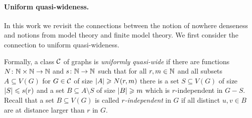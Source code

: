 \begin{comment}
These alternative characterizations have been very useful in 
the design of efficient algorithms. For instance, 
the {\sc{Subgraph Isomorphism}} and {\sc{Homomorphism}} problems 
are fixed-parameter tractable on any nowhere dense
class, parameterized by the size of the pattern graph~\cite{nevsetvril2010first}
and so is the {\sc Distance-$r$ Dominating Set} problem, parameterized
by the size of the solution~\cite{DawarK09}. In fact, 
the {\sc Distance-$r$ Dominating Set} problem admits
polynomial kernels~\cite{siebertz2016polynomial} and even 
almost linear kernels on nowhere dense classes of 
graphs~\cite{eickmeyer2016neighborhood}
(see also~\cite{drange2016kernelization} for the case $r=1$). 
It was shown in~\cite{grohe2014deciding}
that every first-order definable problem can be decided in
almost linear time on any nowhere dense graph class.

It is a natural question to ask for the most general classes of graphs
which admit efficient solutions for certain problems, or to 
classify them into tractable and intractable classes. It was shown 
that for the first-order model-checking problem~\cite{dvovrak2013testing} and for
the {\sc Distance-$r$ Dominating Set} problem~\cite{drange2016kernelization} 
the dividing line for algorithmic tractability 
on subgraph closed classes of graphs is exactly between the
nowhere dense and somewhere dense graph classes. 
\end{comment}

\paragraph{Uniform quasi-wideness.}

In this work we revisit the connections between the notion of nowhere 
denseness and notions from  model theory and finite model theory.
We first consider the connection to uniform quasi-wideness.



Formally, a class $\mathcal{C}$ of graphs is \emph{uniformly quasi-wide} if there are
functions $N\colon \mathbb{N}\times\mathbb{N}\rightarrow \mathbb{N}$ and $s\colon \mathbb{N}\rightarrow \mathbb{N}$ such
that for all $r,m\in \mathbb{N}$ and all subsets $A\subseteq V(G)$ for
$G\in \mathcal{C}$ of size $\left\lvert A\right\rvert\geqslant N(r,m)$ there is a set
$S\subseteq V(G)$ of size $\left\lvert S\right\rvert\leqslant s(r)$ and a set
$B\subseteq A\setminus S$ of size $\left\lvert B\right\rvert\geqslant m$ which is $r$-independent in
$G-S$. Recall that a set $B\subseteq V(G)$ is called {\em{$r$-independent}} in $G$ if all
distinct $u,v\in B$ are at distance 
larger than $r$ in $G$.

